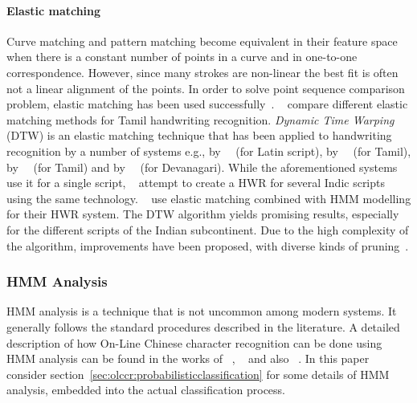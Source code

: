 \paragraph{Elastic matching}
Curve matching and pattern matching become equivalent in their feature space
when there is a constant number of points in a curve and in one-to-one 
correspondence. However, since many strokes are non-linear the best fit is often
not a linear alignment of the points.
In order to solve point sequence comparison problem, elastic matching has 
been used successfully~.
~\citeyear{Joshi2004a} compare different elastic matching methods for Tamil 
handwriting recognition. \emph{Dynamic Time Warping} (DTW) is an elastic 
matching technique that has been applied to handwriting recognition by a number 
of systems e.g., by~~\citeyear{Vuori2001} (for Latin script), 
by~~\citeyear{Niels2004} (for Tamil), 
by~~\citeyear{Joshi2004b} (for Tamil) and 
by~~\citeyear{Joshi2005} (for Devanagari). 
While the aforementioned systems use it for a single script, 
~\citeyear{Bharath2009} attempt to create a HWR for several 
Indic scripts using the same technology. 
~\citeyear{BahlmannBurkhardt2004} use elastic 
matching combined with HMM modelling for their HWR system. 
The DTW algorithm yields promising results, 
especially for the different scripts of the Indian subcontinent.
Due to the high complexity of the algorithm, improvements have been proposed,
with diverse kinds of pruning~.

\subsubsection{HMM Analysis}
\label{sec:hmmanalysis}

HMM analysis is a technique that is not uncommon among modern systems.
It generally follows the standard procedures described in the literature.
A detailed description of how On-Line Chinese character recognition can be
done using HMM analysis can be found in the works of 
~\citeyear{Hu2000},
~\citeyear{Hu1996} and also 
~\citeyear{BahlmannBurkhardt2004}.
In this paper consider section~\ref{sec:olccr:probabilisticclassification} for
some details of HMM analysis, embedded into the actual classification process.

